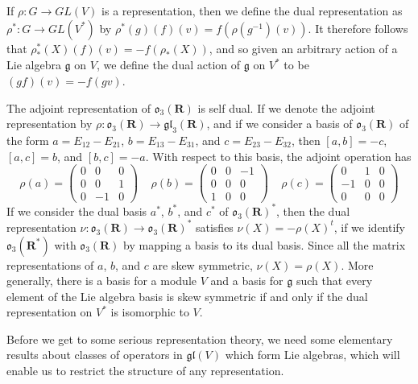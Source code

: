\begin{example}
    If $\rho: G \to GL(V)$ is a representation, then we define the dual representation as $\rho^*: G \to GL(V^*)$ by $\rho^*(g)(f)(v) = f(\rho(g^{-1})(v))$. It therefore follows that $\rho^*_*(X)(f)(v) = -f(\rho_*(X))$, and so given an arbitrary action of a Lie algebra $\mathfrak{g}$ on $V$, we define the dual action of $\mathfrak{g}$ on $V^*$ to be $(gf)(v) = -f(gv)$.
\end{example}

\begin{example}
    The adjoint representation of $\mathfrak{o}_3(\mathbf{R})$ is self dual. If we denote the adjoint representation by $\rho: \mathfrak{o}_3(\mathbf{R}) \to \mathfrak{gl}_3(\mathbf{R})$, and if we consider a basis of $\mathfrak{o}_3(\mathbf{R})$ of the form $a = E_{12} - E_{21}$, $b = E_{13} - E_{31}$, and $c = E_{23} - E_{32}$, then $[a,b] = -c$, $[a,c] = b$, and $[b,c] = -a$. With respect to this basis, the adjoint operation has
    \[ \rho(a) = \begin{pmatrix} 0 & 0 & 0 \\ 0 & 0 & 1 \\ 0 & -1 & 0 \end{pmatrix}\ \ \ \ \ \rho(b) = \begin{pmatrix} 0 & 0 & -1 \\ 0 & 0 & 0 \\ 1 & 0 & 0 \end{pmatrix}\ \ \ \ \ \rho(c) = \begin{pmatrix} 0 & 1 & 0 \\ -1 & 0 & 0 \\ 0 & 0 & 0 \end{pmatrix} \]
    If we consider the dual basis $a^*$, $b^*$, and $c^*$ of $\mathfrak{o}_3(\mathbf{R})^*$, then the dual representation $\nu: \mathfrak{o}_3(\mathbf{R}) \to \mathfrak{o}_3(\mathbf{R})^*$ satisfies $\nu (X) = - \rho(X)^t$, if we identify $\mathfrak{o}_3(\mathbf{R}^*)$ with $\mathfrak{o}_3(\mathbf{R})$ by mapping a basis to its dual basis. Since all the matrix representations of $a$, $b$, and $c$ are skew symmetric, $\nu(X) = \rho(X)$. More generally, there is a basis for a module $V$ and a basis for $\mathfrak{g}$ such that every element of the Lie algebra basis is skew symmetric if and only if the dual representation on $V^*$ is isomorphic to $V$.
\end{example}

Before we get to some serious representation theory, we need some elementary results about classes of operators in $\mathfrak{gl}(V)$ which form Lie algebras, which will enable us to restrict the structure of any representation.

